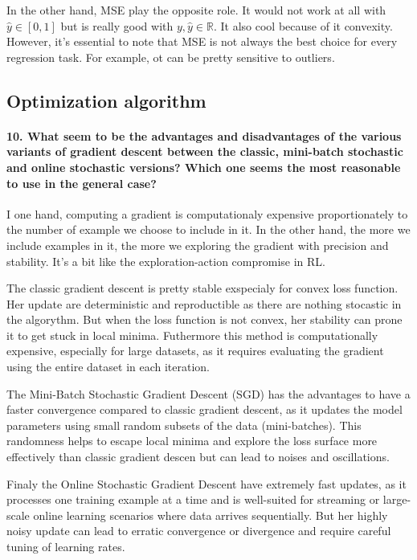 \documentclass{article}
\theoremstyle{plain}%
\theoremstyle{definition}
\theoremstyle{remark}
\begin{document}
In the other hand, MSE play the opposite role. It would not work at all with $ \hat{y} \in [0,1] $ but is really good with $ y, \hat{y} \in \mathbb{R} $. It also cool because of it convexity. However, it's essential to note that MSE is not always the best choice for every regression task. For example, ot can be pretty sensitive to outliers.

\subsection{Optimization algorithm}

\paragraph{10. What seem to be the advantages and disadvantages of the various variants of gradient descent between the classic, mini-batch stochastic and online stochastic versions? Which one seems the most reasonable to use in the general case?}
I one hand, computing a gradient is computationaly expensive proportionately to the number of example we choose to include in it. In the other hand, the more we include examples in it, the more we exploring the gradient with precision and stability. It's a bit like the exploration-action compromise in RL. 

The classic gradient descent is pretty stable exspecialy for convex loss function. Her update are deterministic and reproductible as there are nothing stocastic in the algorythm. But when the loss function is not convex, her stability can prone it to get stuck in local minima. Futhermore this method is computationally expensive, especially for large datasets, as it requires evaluating the gradient using the entire dataset in each iteration.

The Mini-Batch Stochastic Gradient Descent (SGD) has the advantages to have a faster convergence compared to classic gradient descent, as it updates the model parameters using small random subsets of the data (mini-batches). This randomness helps to escape local minima and explore the loss surface more effectively than classic gradient descen but can lead to noises and oscillations.

Finaly the Online Stochastic Gradient Descent have extremely fast updates, as it processes one training example at a time and is well-suited for streaming or large-scale online learning scenarios where data arrives sequentially. But her highly noisy update can lead to erratic convergence or divergence and require careful tuning of learning rates.
\end{document}
